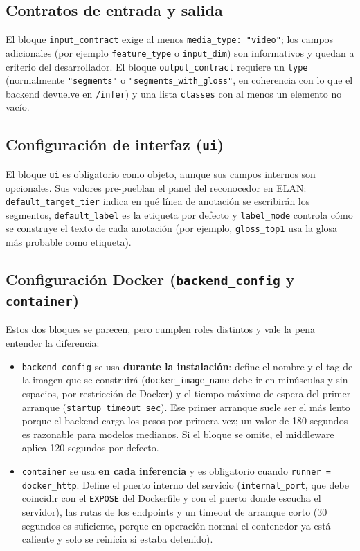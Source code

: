 \documentclass[12pt,a4paper]{article}
\begin{document}
\subsection{Contratos de entrada y salida}

El bloque \texttt{input\_contract} exige al menos \texttt{media\_type: "video"}; los campos adicionales (por ejemplo \texttt{feature\_type} o \texttt{input\_dim}) son informativos y quedan a criterio del desarrollador. El bloque \texttt{output\_contract} requiere un \texttt{type} (normalmente \texttt{"segments"} o \texttt{"segments\_with\_gloss"}, en coherencia con lo que el backend devuelve en \texttt{/infer}) y una lista \texttt{classes} con al menos un elemento no vacío.

\subsection{Configuración de interfaz (\texttt{ui})}

El bloque \texttt{ui} es obligatorio como objeto, aunque sus campos internos son opcionales. Sus valores pre-pueblan el panel del reconocedor en ELAN: \texttt{default\_target\_tier} indica en qué línea de anotación se escribirán los segmentos, \texttt{default\_label} es la etiqueta por defecto y \texttt{label\_mode} controla cómo se construye el texto de cada anotación (por ejemplo, \texttt{gloss\_top1} usa la glosa más probable como etiqueta).

\subsection{Configuración Docker (\texttt{backend\_config} y \texttt{container})}

Estos dos bloques se parecen, pero cumplen roles distintos y vale la pena entender la diferencia:

\begin{itemize}[topsep=2pt]
    \item \texttt{backend\_config} se usa \textbf{durante la instalación}: define el nombre y el tag de la imagen que se construirá (\texttt{docker\_image\_name} debe ir en minúsculas y sin espacios, por restricción de Docker) y el tiempo máximo de espera del primer arranque (\texttt{startup\_timeout\_sec}). Ese primer arranque suele ser el más lento porque el backend carga los pesos por primera vez; un valor de 180 segundos es razonable para modelos medianos. Si el bloque se omite, el middleware aplica 120 segundos por defecto.
    \item \texttt{container} se usa \textbf{en cada inferencia} y es obligatorio cuando \texttt{runner = docker\_http}. Define el puerto interno del servicio (\texttt{internal\_port}, que debe coincidir con el \texttt{EXPOSE} del Dockerfile y con el puerto donde escucha el servidor), las rutas de los endpoints y un timeout de arranque corto (30 segundos es suficiente, porque en operación normal el contenedor ya está caliente y solo se reinicia si estaba detenido).
\end{itemize}
\end{document}
